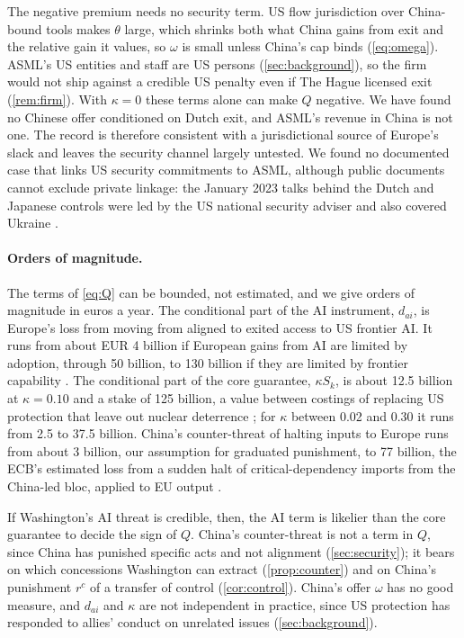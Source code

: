 The negative premium needs no security term. US flow jurisdiction over China-bound tools makes $\theta$ large, which shrinks both what China gains from exit and the relative gain it values, so $\omega$ is small unless China's cap binds (\cref{eq:omega}). ASML's US entities and staff are US persons (\cref{sec:background}), so the firm would not ship against a credible US penalty even if The Hague licensed exit (\cref{rem:firm}). With $\kappa=0$ these terms alone can make $Q$ negative. We have found no Chinese offer conditioned on Dutch exit, and ASML's revenue in China is not one. The record is therefore consistent with a jurisdictional source of Europe's slack and leaves the security channel largely untested. We found no documented case that links US security commitments to ASML, although public documents cannot exclude private linkage: the January 2023 talks behind the Dutch and Japanese controls were led by the US national security adviser and also covered Ukraine \citep{durbin2023biden}.

\paragraph{Orders of magnitude.} The terms of \cref{eq:Q} can be bounded, not estimated, and we give orders of magnitude in euros a year. The conditional part of the AI instrument, $d_{ai}$, is Europe's loss from moving from aligned to exited access to US frontier AI. It runs from about EUR 4 billion if European gains from AI are limited by adoption, through 50 billion, to 130 billion if they are limited by frontier capability \citep{acemoglu2024simple, filippucci2025g7, epoch2026eci}. The conditional part of the core guarantee, $\kappa S_k$, is about 12.5 billion at $\kappa=0.10$ and a stake of 125 billion, a value between costings of replacing US protection that leave out nuclear deterrence \citep{iiss2025defending, burilkov2025defending}; for $\kappa$ between 0.02 and 0.30 it runs from 2.5 to 37.5 billion. China's counter-threat of halting inputs to Europe runs from about 3 billion, our assumption for graduated punishment, to 77 billion, the ECB's estimated loss from a sudden halt of critical-dependency imports from the China-led bloc, applied to EU output \citep{attinasi2025hidden}.

If Washington's AI threat is credible, then, the AI term is likelier than the core guarantee to decide the sign of $Q$. China's counter-threat is not a term in $Q$, since China has punished specific acts and not alignment (\cref{sec:security}); it bears on which concessions Washington can extract (\cref{prop:counter}) and on China's punishment $r^c$ of a transfer of control (\cref{cor:control}). China's offer $\omega$ has no good measure, and $d_{ai}$ and $\kappa$ are not independent in practice, since US protection has responded to allies' conduct on unrelated issues (\cref{sec:background}).


